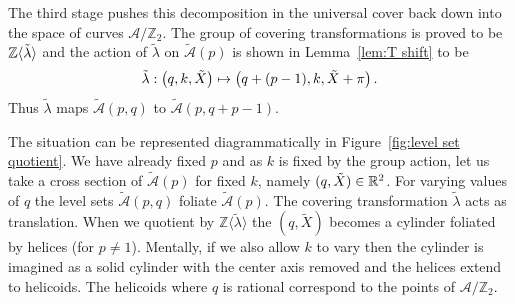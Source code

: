 \documentclass{article}
\begin{document}
The third stage pushes this decomposition in the universal cover back down into the space of curves $\mathcal{A}/\mathbb{Z}_2$.
The group of covering transformations is proved to be $\mathbb{Z}\langle \tilde{\lambda} \rangle$ and the action of $\tilde{\lambda}$ on $\mathcal{\tilde{A}}(p)$ is shown in Lemma~\ref{lem:T shift} to be
\[
\tilde{\lambda} : \left(q,k,\tilde{X}\right) \mapsto \left(q + (p-1),k,\tilde{X} + \pi\right).
\]
Thus $\tilde{\lambda}$ maps $\mathcal{\tilde{A}}(p,q)$ to $\mathcal{\tilde{A}}(p,q + p-1)$. 

The situation can be represented diagrammatically in Figure~\ref{fig:level set quotient}. We have already fixed $p$ and as $k$ is fixed by the group action, let us take a cross section of $\mathcal{\tilde{A}}(p)$ for fixed $k$, namely $(q,\tilde{X}) \in \mathbb{R}^2$. For varying values of $q$ the level sets $\mathcal{\tilde{A}}(p,q)$ foliate $\mathcal{\tilde{A}}(p)$. The covering transformation $\tilde{\lambda}$ acts as translation. When we quotient by $\mathbb{Z}\langle\tilde{\lambda}\rangle$ the $(q,\tilde{X})$ becomes a cylinder foliated by helices (for $p\neq 1$). Mentally, if we also allow $k$ to vary then the cylinder is imagined as a solid cylinder with the center axis removed and the helices extend to helicoids. The helicoids where $q$ is rational correspond to the points of $\mathcal{A}/\mathbb{Z}_2$.
\end{document}
